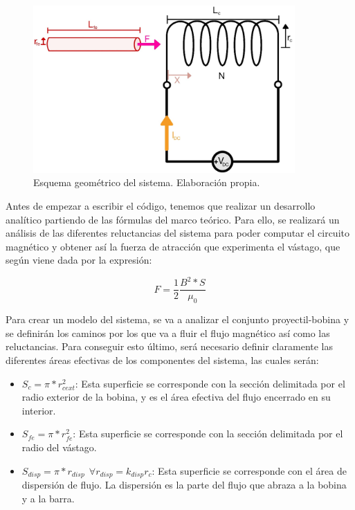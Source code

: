 \begin{figure}[H]
    \centering
    \includegraphics[width=10cm]{FigurasMemoria/esquemaDesTeor.jpg}
    \caption{Esquema geométrico del sistema. Elaboración propia.}
    \label{fig:esquemaDesTeor} %
\end{figure}

Antes de empezar a escribir el código, tenemos que realizar un desarrollo analítico partiendo de las fórmulas del marco teórico. Para ello, se realizará un análisis de las diferentes reluctancias del sistema para poder computar el circuito magnético y obtener así la fuerza de atracción que experimenta el vástago, que según \citeauthor{jerez2016resueltos} viene dada por la expresión:

\begin{center}
\[F=\frac{1}{2}\frac{B^2*S}{\mu_0}\]
\end{center}

Para crear un modelo del sistema, se va a analizar el conjunto proyectil-bobina y se definirán los caminos por los que va a fluir el flujo magnético así como las reluctancias. Para conseguir esto último, será necesario definir claramente las diferentes áreas efectivas de los componentes del sistema, las cuales serán:

\begin{itemize}
    \item \(S_{c}=\pi *r_{cext}^2\): Esta superficie se corresponde con la sección delimitada por el radio exterior de la bobina, y es el área efectiva del flujo encerrado en su interior.
    \item \(S_{fe}=\pi *r_{fe}^2\): Esta superficie se corresponde con la sección delimitada por el radio del vástago.
    \item \(S_{disp}=\pi *r_{disp}~~\forall r_{disp} = k_{disp}r_c\): Esta superficie se corresponde con el área de dispersión de flujo. La dispersión es la parte del flujo que abraza a la bobina y a la barra.
\end{itemize}

